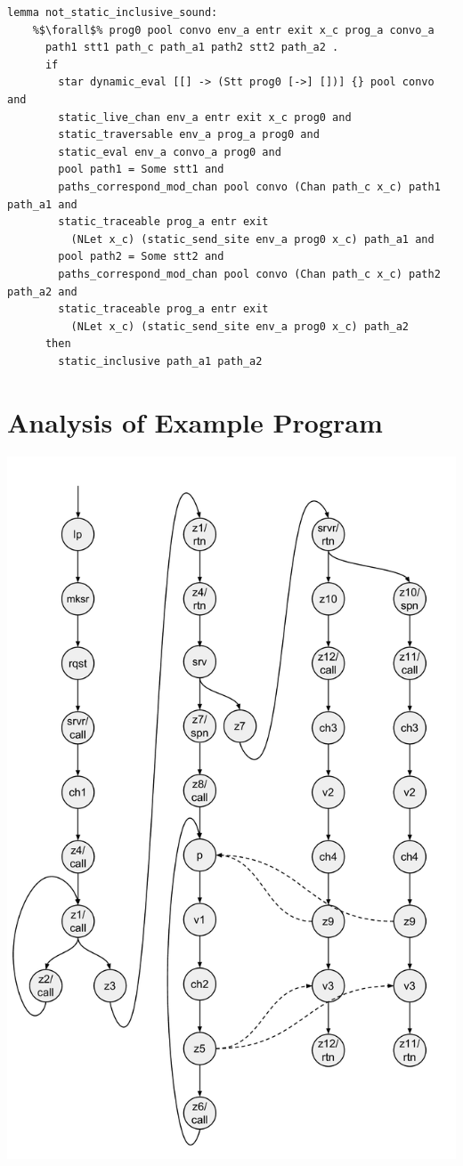 \documentclass{article}
\begin{document}
\begin{lstlisting}[language=logic, escapechar=\%]
  lemma not_static_inclusive_sound:
    %$\forall$% prog0 pool convo env_a entr exit x_c prog_a convo_a
      path1 stt1 path_c path_a1 path2 stt2 path_a2 .
      if
        star dynamic_eval [[] -> (Stt prog0 [->] [])] {} pool convo and 
        static_live_chan env_a entr exit x_c prog0 and 
        static_traversable env_a prog_a prog0 and 
        static_eval env_a convo_a prog0 and 
        pool path1 = Some stt1 and 
        paths_correspond_mod_chan pool convo (Chan path_c x_c) path1 path_a1 and 
        static_traceable prog_a entr exit
          (NLet x_c) (static_send_site env_a prog0 x_c) path_a1 and 
        pool path2 = Some stt2 and 
        paths_correspond_mod_chan pool convo (Chan path_c x_c) path2 path_a2 and 
        static_traceable prog_a entr exit
          (NLet x_c) (static_send_site env_a prog0 x_c) path_a2
      then
        static_inclusive path_a1 path_a2
  \end{lstlisting}

\section{Analysis of Example Program}


  \includegraphics[scale=0.4]{cml_graph.pdf}
  
\end{document}
